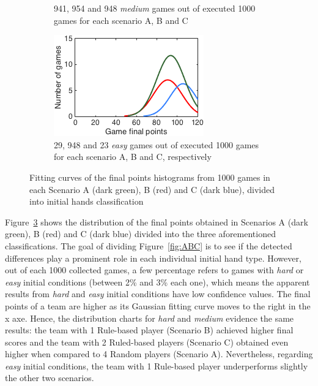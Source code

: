 \begin{figure}[h]
\begin{subfigure}[h]{0.32\textwidth}
                \caption{941, 954 and 948 \emph{medium} games out of executed 1000 games for each scenario A, B and C}
                \label{fig:ABC-Hmedium}
        \end{subfigure}
        \begin{subfigure}[h]{0.32\textwidth}
                \includegraphics[width=\textwidth]{./img/4/ABCeasy}
                \caption{29, 948 and 23 \emph{easy} games out of executed 1000 games for each scenario A, B and C, respectively}
                \label{fig:ABC-Heasy}
        \end{subfigure}
        \caption{Fitting curves of the final points histograms from 1000 games in each Scenario A (dark green), B (red) and C (dark blue), divided into initial hands classification}
        \label{fig:ABC-CH}
\end{figure}

Figure~\ref{fig:ABC-CH} shows the distribution of the final points obtained in Scenarios A (dark green), B (red) and C (dark blue) divided into the three aforementioned classifications.
The goal of dividing Figure~\ref{fig:ABC} is to see if the detected differences play a prominent role in each individual initial hand type.
However, out of each 1000 collected games, a few percentage refers to games with \emph{hard} or \emph{easy} initial conditions (between 2\% and 3\% each one), which means the apparent results from \emph{hard} and \emph{easy} initial conditions have low confidence values.
The final points of a team are higher as its Gaussian fitting curve moves to the right in the x axe.
Hence, the distribution charts for \emph{hard} and \emph{medium} evidence the same results: the team with 1 Rule-based player (Scenario B) achieved higher final scores and the team with 2 Ruled-based players (Scenario C) obtained even higher when compared to 4 Random players (Scenario A).
Nevertheless, regarding \emph{easy} initial conditions, the team with 1 Rule-based player underperforms slightly the other two scenarios.

